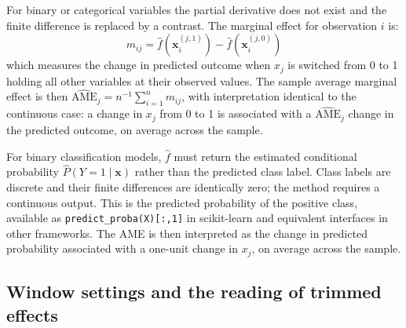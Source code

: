 \documentclass[12pt,a4paper]{article}
\numberwithin{equation}{section}
\theoremstyle{plain}
\theoremstyle{definition}
\begin{document}
	For binary or categorical variables the partial derivative does not exist and the finite difference is replaced by a contrast. The marginal effect for observation $i$ is:
	\begin{equation}
		m_{ij} = \hat{f}\!\left(\mathbf{x}_i^{(j,1)}\right) - \hat{f}\!\left(\mathbf{x}_i^{(j,0)}\right)
	\end{equation}
	which measures the change in predicted outcome when $x_j$ is switched from 0 to 1 holding all other variables at their observed values. The sample average marginal effect is then $\widehat{\mathrm{AME}}_j = n^{-1}\sum_{i=1}^n m_{ij}$, with interpretation identical to the continuous case: a change in $x_j$ from 0 to 1 is associated with a $\widehat{\mathrm{AME}}_j$ change in the predicted outcome, on average across the sample.
	
	For binary classification models, $\hat{f}$ must return the estimated conditional probability $\hat{P}(Y=1 \mid \mathbf{x})$ rather than the predicted class label. Class labels are discrete and their finite differences are identically zero; the method requires a continuous output. This is the predicted probability of the positive class, available as \texttt{predict\_proba(X)[:,1]} in scikit-learn and equivalent interfaces in other frameworks. The AME is then interpreted as the change in predicted probability associated with a one-unit change in $x_j$, on average across the sample.
	
	\subsection*{Window settings and the reading of trimmed effects}
\end{document}
